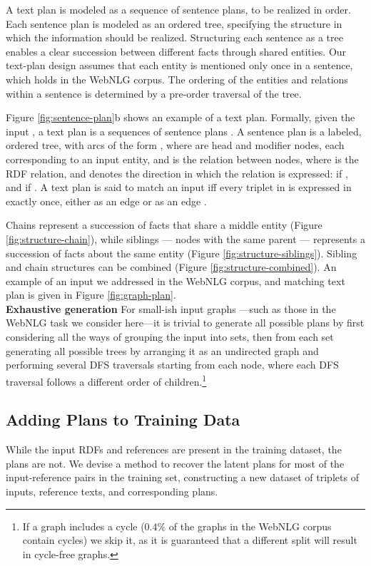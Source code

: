\documentclass[11pt,a4paper]{article}
\begin{document}
A text plan is modeled as a sequence of sentence plans, to be realized in order. Each sentence plan is modeled as an ordered tree, specifying the structure in which the information should be realized. Structuring each sentence as a tree enables a clear succession between different facts through shared entities. Our text-plan design assumes that each entity is mentioned only once in a sentence, which holds in the WebNLG corpus.
The ordering of the entities and relations within a sentence is determined by a pre-order traversal of the tree.

Figure \ref{fig:sentence-plan}b shows an example of a text plan. 
Formally, given the input , a text plan  is a sequences of sentence plans . A sentence plan  is a labeled, ordered tree, with arcs of the form , where  are head and modifier nodes, each corresponding to an input entity, and  is the relation between nodes, where  is the RDF relation, and  denotes the direction in which the relation is expressed:  if , and  if .
A text plan  is said to match an input  iff every triplet  in  is expressed in  exactly once, either as an edge  or as an edge .

Chains  represent a succession of facts that share a middle entity (Figure \ref{fig:structure-chain}), while siblings --- nodes with the same parent ---  represents a succession of facts about the same entity (Figure \ref{fig:structure-siblings}). Sibling and chain structures can be combined (Figure \ref{fig:structure-combined}).
An example of an input we addressed in the WebNLG corpus, and matching text plan is given in Figure \ref{fig:graph-plan}.\\
\textbf{Exhaustive generation } For small-ish input graphs ---such as those in the WebNLG task we consider here---it is trivial to generate all possible plans by first considering all the ways of grouping the input into sets, then from each set generating all possible trees by arranging it as an undirected graph and performing several DFS traversals starting from each node, where each DFS traversal follows a different order of children.\footnote{If a graph includes a cycle (0.4\% of the graphs in the WebNLG corpus contain cycles) we skip it, as it is guaranteed that a different split will result in cycle-free graphs.}


\subsection{Adding Plans to Training Data}\label{sec:plan-train}
While the input RDFs and references are present in the training dataset, the plans are not. We devise a method to recover the latent plans for most of the input-reference pairs in the training set, constructing a new dataset of  triplets of inputs, reference texts, and corresponding plans.
\end{document}
